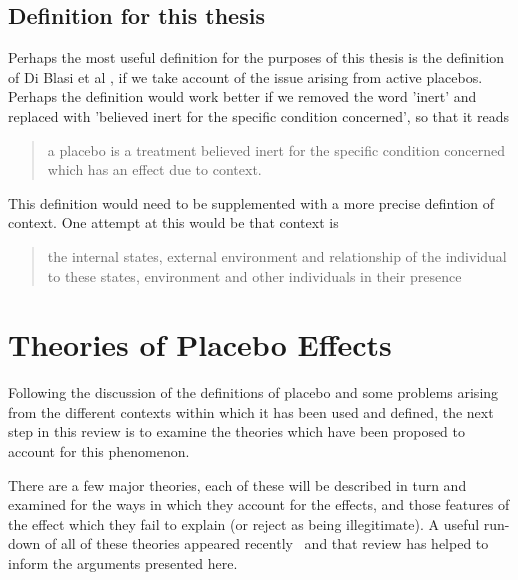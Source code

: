 
\subsection{Definition for this thesis}
\label{sec:defin-this-thes}


Perhaps the most useful definition for the purposes of this thesis is the definition of Di Blasi et al \cite{Blasi2001}, if we take account of the issue arising from active placebos. Perhaps the definition would work better if we removed the word 'inert' and replaced with 'believed inert for the specific condition concerned', so that it reads

\begin{quotation}
  a placebo is a treatment believed inert for the specific condition
  concerned which has an effect due to context.
\end{quotation}

This definition would need to be supplemented with a more precise defintion of context. One attempt at this would be that context is

\begin{quotation}
   the internal states, external environment and relationship of the individual to these states, environment and other individuals in their presence 
\end{quotation}





\section{Theories of Placebo Effects}
\label{sec:theor-plac-effects}

Following the discussion of the definitions of placebo and some problems arising from the different contexts within which it has been used and defined, the next step in this review is to examine the theories which have been proposed to account for this phenomenon. 

There are a few major theories, each of these will be described in turn  and examined for the ways in which they account for the effects, and those features of the effect which they fail to explain (or reject as being illegitimate). A useful run-down of all of these theories appeared recently~\cite{Stewart-Williams2004b} and that review has helped to inform the arguments presented here. 

